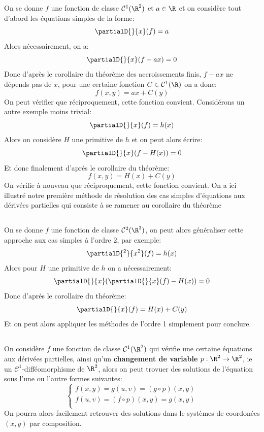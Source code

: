 \subsection*{}
On se donne \(f\) une fonction de classe \(\mathcal{C}^1(\R^2)\) et \(a \in \R\) et on considère tout d'abord les équations simples de la forme:
\[
   \partialD{}{x}(f) = a 
\]
Alors nécessairement, on a:
\[
   \partialD{}{x}(f - ax) = 0 
\]
Donc d'après le corollaire du théorème des accroissements finis, \(f - ax\) ne dépends pas de \(x\), pour une certaine fonction \(C \in \mathcal{C}^1(\R)\) on a donc:
\[
   f(x, y) = ax + C(y)
\]
On peut vérifier que réciproquement, cette fonction convient. Considérons un autre exemple moins trivial:
\[
   \partialD{}{x}(f) = h(x)   
\]
Alors on considère \(H\) une primitive de \(h\) et on peut alors écrire:
\[
   \partialD{}{x}(f - H(x)) = 0
\]
Et donc finalement d'aprés le corollaire du théorème:
\[
   f(x, y) = H(x) + C(y) 
\]
On vérifie à nouveau que réciproquement, cette fonction convient. On a ici illustré notre première méthode de résolution des cas simples d'équations aux dérivées partielles qui consiste à se ramener au corollaire du théorème
\subsection*{}
On se donne \(f\) une fonction de classe \(\mathcal{C}^2(\R^2)\), on peut alors généraliser cette approche aux cas simples à l'ordre 2, par exemple:
\[
   \partialD{{}^2}{x^2}(f) = h(x)   
\]
Alors pour \(H\) une primitive de \(h\) on a nécessairement:
\[
   \partialD{}{x}(\partialD{}{x}(f) - H(x)) = 0 
\]
Donc d'aprés le corollaire du théorème:
\[
   \partialD{}{x}(f) = H(x) + C(y)
\]
Et on peut alors appliquer les méthodes de l'ordre 1 simplement pour conclure.

\subsection*{}
On considère \(f\) une fonction de classe \(\mathcal{C}^1(\R^2)\) qui vérifie une certaine équations aux dérivées partielles, ainsi qu'un \textbf{changement de variable} \(p : \R^2 \rightarrow \R^2\), ie un \(\mathcal{C}^1\)-difféomorphisme de \(\R^2\), alors on peut trovuer des solutions de l'équation sous l'une ou l'autre formes suivantes:
\[
   \begin{cases}
      f(x, y) = g(u, v) = (g \circ p)(x, y) \\
      f(u, v) = (f \circ p)(x, y) = g(x, y)\\
   \end{cases}
\]
On pourra alors facilement retrouver des solutions dans le systèmes de coordonées \((x, y)\) par composition.\<

